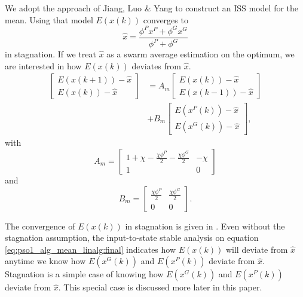 \documentclass{sig-alternate}
\begin{document}
We adopt the approach of Jiang, Luo \& Yang \cite{Jiang20078} to construct an ISS model for the mean.
Using that model $ E( x(k) ) $ converges to 
\begin{equation}
\nonumber
\hat{x} = \frac{\phi^{P} x^{P} + \phi^{G} x^{G} }{ \phi^{P} + \phi^{G} } 
\end{equation}
in stagnation.
If we treat $ \hat{x} $ as a swarm average estimation on the optimum, we are interested in how $ E( x(k) ) $ deviates from $ \hat{x} $.
\begin{equation}
\label{eq:pso1_alg_mean_linalg:final}
\begin{aligned}
\begin{bmatrix}
E( x(k+1) ) - \hat{x} \\
E( x(k) ) - \hat{x}
\end{bmatrix}
& = 
A_{m}
\begin{bmatrix}
E( x(k) ) - \hat{x} \\
E( x(k-1) ) - \hat{x}
\end{bmatrix}
\\ & +
B_{m}
\begin{bmatrix}
E( x^{P}(k) ) - \hat{x}\\
E( x^{G}(k) ) - \hat{x}
\end{bmatrix},
\end{aligned}
\end{equation}
with 
\begin{equation}
\nonumber
A_{m} = \begin{bmatrix}
1 + \chi - \frac{ \chi \phi^{P} }{2} - \frac{ \chi \phi^{G} }{2} & -\chi \\
1 & 0
\end{bmatrix}
\end{equation}
and
\begin{equation}
\nonumber
B_{m} = \begin{bmatrix}
\frac{ \chi \phi^{P} }{2} & \frac{ \chi \phi^{G} }{2} \\
0 & 0
\end{bmatrix}.
\end{equation}

The convergence of $ E( x(k) ) $ in stagnation is given in \cite{Jiang20078,Poli:2008:DSS:1384929.1384944}.
Even without the stagnation assumption, 
the input-to-state stable analysis on equation \eqref{eq:pso1_alg_mean_linalg:final} indicates how $ E(x(k)) $ will deviate from $ \hat{x} $ anytime we know how $ E( x^{G}(k) ) $ and $ E( x^{P}(k) ) $ deviate from $ \hat{x} $. Stagnation is a simple case of knowing how $ E( x^{G}(k) ) $ and $ E( x^{P}(k) ) $ deviate from $ \hat{x} $. This special case is discussed more later in this paper.
\end{document}
